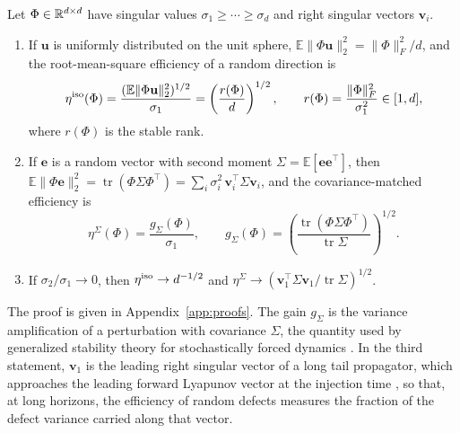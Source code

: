 \begin{proposition}
\label{prop:nulls}
Let $\Phi\in\mathbb{R}^{d\times d}$ have singular values $\sigma_1\ge\cdots\ge\sigma_d$ and right singular vectors $\mathbf v_i$.
\begin{enumerate}
\item If $\mathbf u$ is uniformly distributed on the unit sphere, $\mathbb E\|\Phi\mathbf u\|_2^2=\|\Phi\|_F^2/d$, and the root-mean-square efficiency of a random direction is
\begin{equation}
  \eta^{\rm iso}(\Phi)=\frac{(\mathbb E\|\Phi\mathbf u\|_2^2)^{1/2}}{\sigma_1}=\left(\frac{r(\Phi)}{d}\right)^{1/2},
  \qquad
  r(\Phi)=\frac{\|\Phi\|_F^2}{\sigma_1^2}\in[1,d],
  \label{eq:eta_iso}
\end{equation}
where $r(\Phi)$ is the stable rank.
\item If $\mathbf e$ is a random vector with second moment $\Sigma=\mathbb E[\mathbf e\mathbf e^\top]$, then $\mathbb E\|\Phi\mathbf e\|_2^2=\operatorname{tr}(\Phi\Sigma\Phi^\top)=\sum_i\sigma_i^2\,\mathbf v_i^\top\Sigma\mathbf v_i$, and the covariance-matched efficiency is
\begin{equation}
  \eta^{\Sigma}(\Phi)=\frac{g_\Sigma(\Phi)}{\sigma_1},
  \qquad
  g_\Sigma(\Phi)=\left(\frac{\operatorname{tr}(\Phi\Sigma\Phi^\top)}{\operatorname{tr}\Sigma}\right)^{1/2}.
  \label{eq:eta_cov}
\end{equation}
\item If $\sigma_2/\sigma_1\to0$, then $\eta^{\rm iso}\to d^{-1/2}$ and $\eta^{\Sigma}\to(\mathbf v_1^\top\Sigma\mathbf v_1/\operatorname{tr}\Sigma)^{1/2}$.
\end{enumerate}
\end{proposition}

The proof is given in Appendix~\ref{app:proofs}. The gain $g_\Sigma$ is the variance amplification of a perturbation with covariance $\Sigma$, the quantity used by generalized stability theory for stochastically forced dynamics \citep{farrell1996a,farrell1996b}. In the third statement, $\mathbf v_1$ is the leading right singular vector of a long tail propagator, which approaches the leading forward Lyapunov vector at the injection time \citep{legras1996,kuptsov2012}, so that, at long horizons, the efficiency of random defects measures the fraction of the defect variance carried along that vector.

